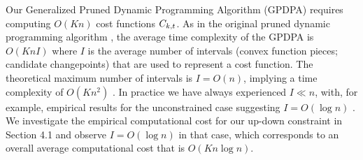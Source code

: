 \documentclass[twoside,11pt]{article}
\begin{document}
Our Generalized Pruned Dynamic Programming Algorithm (GPDPA) requires
computing $O(Kn)$ cost functions $C_{k,t}$. As in the original
pruned dynamic programming algorithm \citep{pruned-dp}, the average time
complexity of the GPDPA is $O(K n I)$ where $I$ is the average number of
intervals (convex function pieces; candidate changepoints) that are
used to represent a cost function. The theoretical maximum number of
intervals is $I=O(n)$, implying a time complexity of $O(K n^2)$
\citep{pruned-dp-new}.
In practice we have always experienced $I\ll n$, with, for example,
empirical results for the unconstrained case suggesting $I=O(\log
n)$ \citep{fpop}. We investigate the empirical computational cost for our up-down
constraint in Section 4.1 and observe $I=O(\log n)$ in that case,
which corresponds to an overall average computational cost that is
$O(Kn\log n)$.
\end{document}
